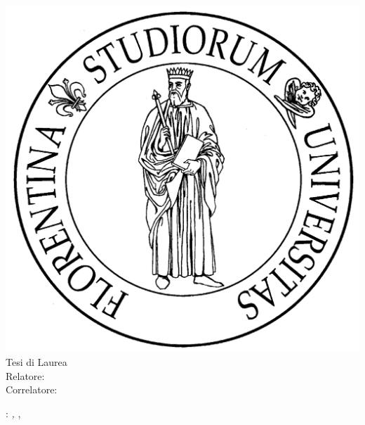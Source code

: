 \begin{titlepage}
	\begin{center}
   	\large
      \hfill
      \vfill
      \begingroup
			\spacedallcaps{\myUni} \\ 
			\myFaculty \\
			\myDegree \\ 
			\vspace{0.5cm}
         \includegraphics[scale=.065]{logo/unifi}\\
         \vspace{0.5cm}    
         Tesi di Laurea    
      \endgroup 
      \vfill 
      \begingroup
      	\color{Maroon}\spacedallcaps{\myTitle} \\ \bigskip
      \endgroup
      \spacedlowsmallcaps{\myName}
      \vfill  
      Relatore: {\itshape\myProf} \\
	  \vspace{0.5cm}
	  Correlatore: {\itshape\myOtherProf}
      \vfill                   
      \myTime
      \vfill                      
	\end{center}        
\end{titlepage}   
   \newpage
	\thispagestyle{empty}
	\hfill
	\vfill
	\noindent\myName: 
	\textit{\myTitle,} 
	\myDegree, \textcopyright\ \myTime
